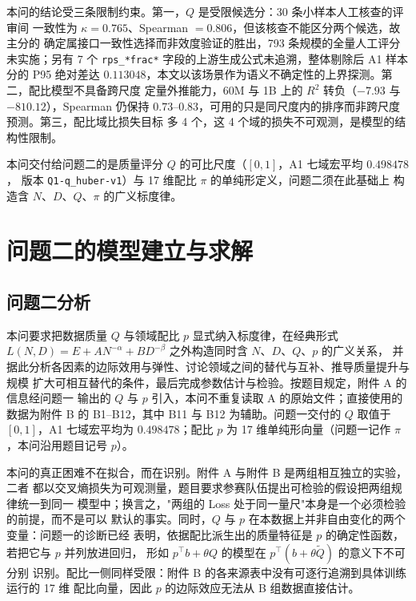\documentclass[bwprint]{gmcmthesis}
\numberwithin{equation}{section}
\numberwithin{figure}{section}
\numberwithin{table}{section}
\begin{document}
本问的结论受三条限制约束。第一，$Q$ 是受限候选分：30 条小样本人工核查的评审间
一致性为 $\kappa=0.765$、Spearman $=0.806$，但该核查不能区分两个候选，故主分的
确定属接口一致性选择而非效度验证的胜出，793 条规模的全量人工评分未实施；另有 7 个
\texttt{rps\_*frac*} 字段的上游生成公式未追溯，整体剔除后 A1 样本分的 P95 绝对差达
$0.113048$，本文以该场景作为语义不确定性的上界探测。第二，配比模型不具备跨尺度
定量外推能力，60M 与 1B 上的 $R^2$ 转负（$-7.93$ 与 $-810.12$），Spearman 仍保持
$0.73$--$0.83$，可用的只是同尺度内的排序而非跨尺度预测。第三，配比域比损失目标
多 4 个，这 4 个域的损失不可观测，是模型的结构性限制。

本问交付给问题二的是质量评分 $Q$ 的可比尺度（$[0,1]$，A1 七域宏平均 $0.498478$，
版本 \texttt{Q1-q\_huber-v1}）与 17 维配比 $\pi$ 的单纯形定义，问题二须在此基础上
构造含 $N$、$D$、$Q$、$\pi$ 的广义标度律。
\clearpage
\section{问题二的模型建立与求解}



\subsection{问题二分析}

本问要求把数据质量 $Q$ 与领域配比 $p$ 显式纳入标度律，在经典形式
$L(N,D)=E+AN^{-\alpha}+BD^{-\beta}$ 之外构造同时含 $N$、$D$、$Q$、$p$ 的广义关系，
并据此分析各因素的边际效用与弹性、讨论领域之间的替代与互补、推导质量提升与规模
扩大可相互替代的条件，最后完成参数估计与检验。按题目规定，附件 A 的信息经问题一
输出的 $Q$ 与 $p$ 引入，本问不重复读取 A 的原始文件；直接使用的数据为附件 B 的
B1--B12，其中 B11 与 B12 为辅助。问题一交付的 $Q$ 取值于 $[0,1]$，A1 七域宏平均为
$0.498478$；配比 $p$ 为 17 维单纯形向量（问题一记作 $\pi$，本问沿用题目记号 $p$）。

本问的真正困难不在拟合，而在识别。附件 A 与附件 B 是两组相互独立的实验，二者
都以交叉熵损失为可观测量，题目要求参赛队伍提出可检验的假设把两组规律统一到同一
模型中；换言之，"两组的 Loss 处于同一量尺"本身是一个必须检验的前提，而不是可以
默认的事实。同时，$Q$ 与 $p$ 在本数据上并非自由变化的两个变量：问题一的诊断已经
表明，依据配比派生出的质量特征是 $p$ 的确定性函数，若把它与 $p$ 并列放进回归，
形如 $p^{\top}b+\theta Q$ 的模型在 $p^{\top}(b+\theta\tilde Q)$ 的意义下不可分别
识别。配比一侧同样受限：附件 B 的各来源表中没有可逐行追溯到具体训练运行的 17 维
配比向量，因此 $p$ 的边际效应无法从 B 组数据直接估计。
\end{document}
